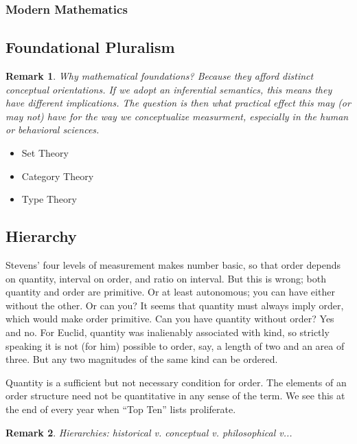 \documentclass[11pt,twoside]{article}
\newtheorem{remark}{Remark}
\begin{document}
\subsubsection{Modern Mathematics}

\subsection{Foundational Pluralism}

\begin{remark}
  Why mathematical foundations?  Because they afford distinct
  \textit{conceptual} orientations.  If we adopt an inferential
  semantics, this means they have different implications.  The
  question is then what practical effect this may (or may not) have
  for the way we conceptualize measurment, especially in the human or
  behavioral sciences.
\end{remark}

\begin{itemize}
\item Set Theory
\item Category Theory
\item Type Theory
\end{itemize}

\subsection{Hierarchy}
Stevens' four levels of measurement makes number basic, so
that order depends on quantity, interval on order, and ratio on
interval.  But this is wrong; both quantity and order are primitive.
Or at least autonomous; you can have either without the other.  Or can
you?  It seems that quantity must always imply order, which would make
order primitive.  Can you have quantity without order?  Yes and no.
For Euclid, quantity was inalienably associated with kind, so strictly
speaking it is not (for him) possible to order, say, a length of two
and an area of three.  But any two magnitudes of the same kind can be
ordered.

Quantity is a sufficient but not necessary condition for order.  The
elements of an order structure need not be quantitative in any sense
of the term.  We see this at the end of every year when ``Top Ten''
lists proliferate.

\begin{remark}
  Hierarchies: historical v. conceptual v. philosophical v...
\end{remark}
\end{document}
